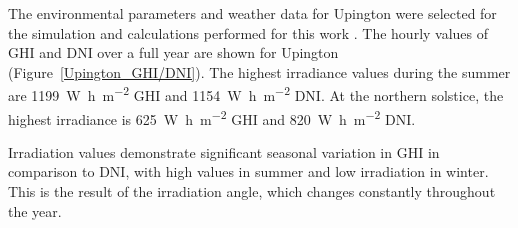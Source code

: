 The environmental parameters and weather data for Upington were selected for the simulation and calculations performed for this work \cite{WhiteBoxTechnologies2015}. The hourly values of \ac{GHI} and \ac{DNI} over a full year are shown for Upington (Figure~\ref{Upington_GHI/DNI}). The highest irradiance values during the summer are \SI{1199}{\watt\hour\per\square\metre} \ac{GHI} and \SI{1154}{\watt\hour\per\square\metre} \ac{DNI}. At the northern solstice, the highest irradiance is \SI{625}{\watt\hour\per\square\metre} \ac{GHI} and \SI{820}{\watt\hour\per\square\metre} \ac{DNI}. 

Irradiation values demonstrate significant seasonal variation in \ac{GHI} in comparison to \ac{DNI}, with high values in summer and low irradiation in winter. This is the result of the irradiation angle, which changes constantly throughout the year. 


